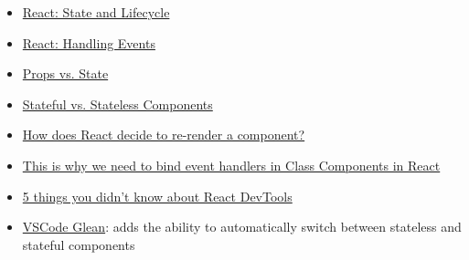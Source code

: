\begin{itemize}[leftmargin=*]
    \item \href{https://reactjs.org/docs/state-and-lifecycle.html}{React: State and Lifecycle}
    \item \href{https://reactjs.org/docs/handling-events.html}{React: Handling Events}
    \item \href{https://kentcdodds.com/blog/props-vs-state}{Props vs. State}
    \item \href{https://code.tutsplus.com/tutorials/stateful-vs-stateless-functional-components-in-react--cms-29541}{Stateful vs. Stateless Components}
    \item \href{http://lucybain.com/blog/2017/react-js-when-to-rerender/}{How does React decide to re-render a component?}
    \item \href{https://medium.freecodecamp.org/this-is-why-we-need-to-bind-event-handlers-in-class-components-in-react-f7ea1a6f93eb}{This is why we need to bind event handlers in Class Components in React}
    \item \href{https://blog.logrocket.com/5-things-you-didnt-know-about-react-devtools-2c6e0ef22529}{5 things you didn’t know about React DevTools}
    \item \href{https://github.com/wix/vscode-glean}{VSCode Glean}: adds the ability to automatically switch between stateless and stateful components
\end{itemize}
